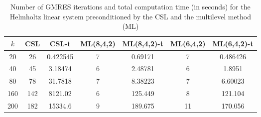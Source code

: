 \begin{table}[t]
\centering
\begin{tabular}{ccccccc}
\hline
$k$ & CSL & CSL-t & ML(8,4,2) & ML(8,4,2)-t& ML(6,4,2) & ML(6,4,2)-t \\ \hline
20 & 26 & 0.422545 & 7 & 0.69171 & 7 & 0.486426 \\
40 & 45 & 3.18474 & 6 & 2.48781 & 6 & 1.8951 \\
80 & 78 & 31.7818 & 7 & 8.38223 & 7 & 6.60023 \\
160 & 142 & 8121.02 & 6 & 125.449 & 8 & 121.104 \\
200 & 182 & 15334.6 & 9 & 189.675 & 11 & 170.056 \\
\hline
\end{tabular}
\caption{Number of GMRES iterations and total computation time (in seconds) for the Helmholtz linear system preconditioned by the  CSL and the multilevel method (ML)}
\label{table:mlgmres_csl_vs_adef_coarse_eps_10}
\end{table}
